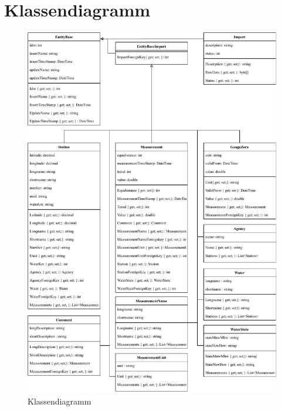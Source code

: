 \section{Klassendiagramm}
\begin{figure}[H]
    \centering
    \includegraphics[width=0.85\linewidth]{figures/classDiagram.pdf}
    \caption[Klassendiagramm]{Klassendiagramm}   
    \label{fig:classDiagramm}
\end{figure}

